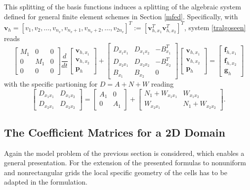 \documentclass[a4paper,10pt,BCOR=15mm]{scrbook}
\begin{document}
This splitting of the basis functions induces a splitting of the algebraic system defined for general finite element schemes in Section \ref{mfed}. Specifically, with $\mathbf v_h = [v_1,v_2,\dotsc,v_{n_v},v_{n_v+1},v_{n_v+2},\dotsc,v_{2n_v}]^T:= [\mathbf v_{h,x_1}^T \mathbf v_{h,x_2}^T]^T$, system \eqref{tralgoseen} reads
\begin{equation*}
	 \begin{bmatrix} M_1& 0 & 0\\ 0& M_1 & 0 \\ 0&0&0 \end{bmatrix} \frac{d}{dt}\begin{bmatrix} \mathbf v_{h,x_1}\\ \mathbf v_{h,x_2} \\ {\mathbf p}_h  \end{bmatrix}+ \begin{bmatrix} D_{x_1x_1}&D_{x_1x_2}& - B_{x_1}^T \\D_{x_2x_1}&D_{x_2x_2} & -B_{x_2}^T \\ B_{x_1} & B_{x_2} & 0 \end{bmatrix} \begin{bmatrix} \mathbf v_{h,x_1}\\ \mathbf v_{h,x_2} \\ {\mathbf p}_h  \end{bmatrix} = \begin{bmatrix} \mathbf f_{h,x_1}\\ \mathbf f_{h,x_2} \\ {\mathbf g}_h  \end{bmatrix} 
\end{equation*}
with the specific partioning for $D=A+N+W$ reading
\begin{equation*}
	 \begin{bmatrix} D_{x_1x_1}&D_{x_1x_2} \\D_{x_2x_1}&D_{x_2x_2} \end{bmatrix} =\begin{bmatrix} A_{1}&0 \\0&A_{1} \end{bmatrix} +\begin{bmatrix} N_{1}+W_{x_1x_1}&W_{x_1x_2} \\W_{x_2x_1}&N_1+W_{x_2x_2} \end{bmatrix} .
\end{equation*}

\subsection{The Coefficient Matrices for a 2D Domain}
Again the model problem of the previous section is considered, which enables a general presentation. For the extension of the presented formulas to nonuniform and nonrectangular grids the local specific geometry of the cells has to be adapted in the formulation.
\end{document}
